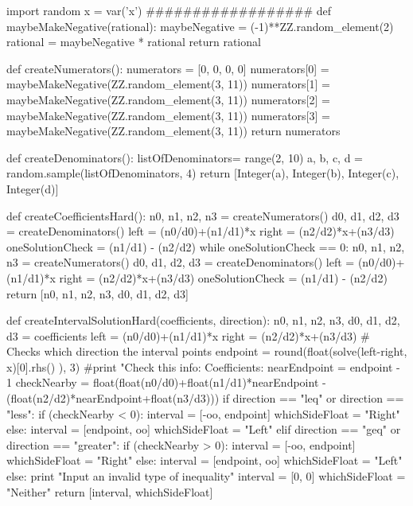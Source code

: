 \documentclass{ximera}
\begin{document}
\begin{sagesilent}
import random
x = var('x')
##################
def maybeMakeNegative(rational):
    maybeNegative = (-1)**ZZ.random_element(2)
    rational = maybeNegative * rational
    return rational
    
def createNumerators():
    numerators = [0, 0, 0, 0]
    numerators[0] = maybeMakeNegative(ZZ.random_element(3, 11))
    numerators[1] = maybeMakeNegative(ZZ.random_element(3, 11))
    numerators[2] = maybeMakeNegative(ZZ.random_element(3, 11))
    numerators[3] = maybeMakeNegative(ZZ.random_element(3, 11))
    return numerators

def createDenominators():
    listOfDenominators= range(2, 10)
    a, b, c, d = random.sample(listOfDenominators, 4)
    return [Integer(a), Integer(b), Integer(c), Integer(d)]

def createCoefficientsHard():
    n0, n1, n2, n3 = createNumerators()
    d0, d1, d2, d3 = createDenominators()
    left = (n0/d0)+(n1/d1)*x
    right = (n2/d2)*x+(n3/d3)
    oneSolutionCheck = (n1/d1) - (n2/d2)
    while oneSolutionCheck == 0:
        n0, n1, n2, n3 = createNumerators()
        d0, d1, d2, d3 = createDenominators()
        left = (n0/d0)+(n1/d1)*x
        right = (n2/d2)*x+(n3/d3)
        oneSolutionCheck = (n1/d1) - (n2/d2)
    return [n0, n1, n2, n3, d0, d1, d2, d3]

def createIntervalSolutionHard(coefficients, direction):
    n0, n1, n2, n3, d0, d1, d2, d3 = coefficients
    left = (n0/d0)+(n1/d1)*x
    right = (n2/d2)*x+(n3/d3)
    # Checks which direction the interval points
    endpoint = round(float(solve(left-right, x)[0].rhs() ), 3)
    #print "Check this info: \n Coefficients: %
    nearEndpoint = endpoint - 1
    checkNearby = float(float(n0/d0)+float(n1/d1)*nearEndpoint - (float(n2/d2)*nearEndpoint+float(n3/d3)))
    if direction == "leq" or direction == "less":
        if (checkNearby < 0):
            interval = [-oo, endpoint]
            whichSideFloat = "Right"
        else:
            interval = [endpoint, oo]
            whichSideFloat = "Left"  
    elif direction == "geq" or direction == "greater": 
        if (checkNearby > 0):
            interval = [-oo, endpoint]
            whichSideFloat = "Right"
        else:
            interval = [endpoint, oo]
            whichSideFloat = "Left"
    else:
        print "Input an invalid type of inequality"
        interval = [0, 0]
        whichSideFloat = "Neither"
    return [interval, whichSideFloat]


\end{sagesilent}
\end{document}
